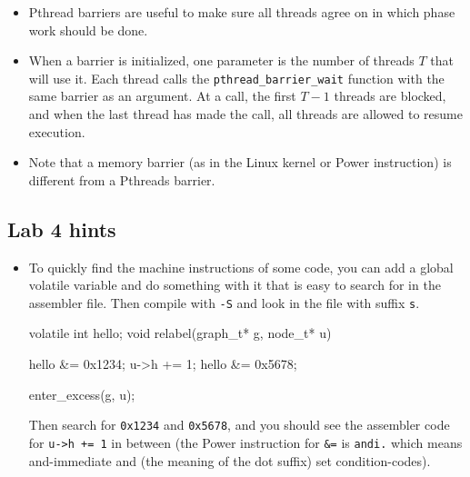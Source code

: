 \documentclass{forsete}
\begin{document}
\begin{itemize}
\begin{ccode}
{	c *= 2; // double the capacity
	b = realloc(a, c * sizeof(a[0]));
	if (b == NULL)
		error("no memory");
	a = b;
}

a[i].x = x;
a[i].y = y;
i += 1;
\end{ccode}
When the array is no longer needed, you call \verb!free(a)!, but you should not
free the old array after using \verb.realloc., since that is taken care of by
\verb.realloc. if needed (it can happen that \verb.realloc. found available memory
after the end of \verb.a. so no free was needed).

\item Pthread barriers are useful to make sure all threads agree on 
in which phase work should be done. 

\item When a barrier is initialized, one parameter is the number of
threads $T$ that will use it. Each thread calls the
\verb.pthread_barrier_wait. 
function with the same barrier as an 
argument. At a call, the first $T-1$ threads are blocked, and when the last thread has
made the call, all threads are allowed to resume execution.

\item Note that a memory barrier (as in the Linux kernel or Power instruction) is different from a Pthreads barrier.


\end{itemize}


\subsection*{Lab 4 hints}
\begin{itemize}
\item To quickly find the machine instructions of some code, you can 
add a global volatile variable and do something with it that is easy to search for in
the assembler file.
Then compile with \verb.-S. and look in the file with suffix \verb.s.. 
\begin{ccode}
volatile int hello;
void relabel(graph_t* g, node_t* u)
{
	hello &= 0x1234;
        u->h += 1;
	hello &= 0x5678;

        enter_excess(g, u);
}
\end{ccode}
Then search for \verb.0x1234. and \verb.0x5678., and you should see the assembler code for \verb.u->h += 1. in
between (the Power instruction for \verb.&=. is \verb!andi.! which means and-immediate and (the meaning of the dot suffix) set condition-codes).




\end{itemize}
\end{document}

